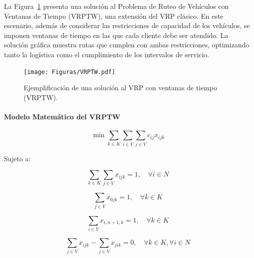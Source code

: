 \documentclass[12pt,titlepage,twoside,openright]{book}
\begin{document}
La Figura~\ref{fig:vrptw} presenta una solución al Problema de Ruteo de Vehículos con Ventanas de Tiempo (VRPTW), una extensión del VRP clásico. En este escenario, además de considerar las restricciones de capacidad de los vehículos, se imponen ventanas de tiempo en las que cada cliente debe ser atendido. La solución gráfica muestra rutas que cumplen con ambas restricciones, optimizando tanto la logística como el cumplimiento de los intervalos de servicio.
\begin{figure}[H]
	\centering
	\texttt{[image: Figuras/VRPTW.pdf]}
	\caption{Ejemplificación de una solución al VRP con ventanas de tiempo (VRPTW).}
	\label{fig:vrptw}
\end{figure}

\paragraph{Modelo Matemático del VRPTW}

\begin{equation}
	\min \sum_{k \in K} \sum_{i \in V} \sum_{j \in V} c_{ij} x_{ijk}
	\label{eq:VRPTW_obj}
\end{equation}

Sujeto a:

\begin{equation}
	\sum_{k \in K} \sum_{j \in V} x_{ijk} = 1, \quad \forall i \in N
	\label{eq:VRPTW_visit_once}
\end{equation}

\begin{equation}
	\sum_{j \in V} x_{0jk} = 1, \quad \forall k \in K
	\label{eq:VRPTW_start_depot}
\end{equation}

\begin{equation}
	\sum_{i \in V} x_{i,n+1,k} = 1, \quad \forall k \in K
	\label{eq:VRPTW_end_depot}
\end{equation}

\begin{equation}
	\sum_{j \in V} x_{ijk} - \sum_{j \in V} x_{jik} = 0, \quad \forall k \in K, \forall i \in N
	\label{eq:VRPTW_flow_balance}
\end{equation}
\end{document}
